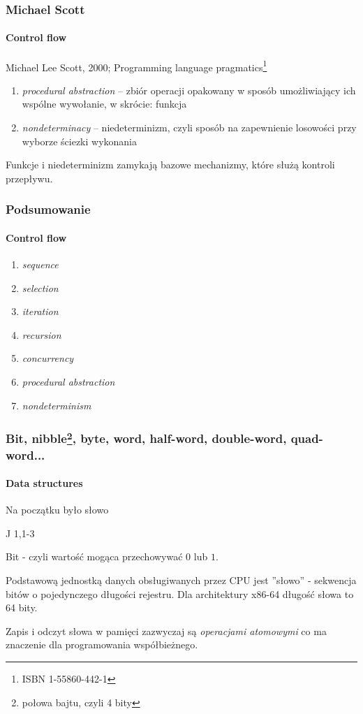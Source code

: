 \documentclass[aspectratio=169]{beamer}
\begin{document}
\begin{frame}
    \frametitle{Michael Scott}
    \framesubtitle{Control flow}

    Michael Lee Scott, 2000; Programming language pragmatics\footnote{ISBN
    1-55860-442-1}

    \vspace{1em}

    \begin{enumerate}
        \item \emph{procedural abstraction} -- zbiór operacji opakowany w sposób
            umożliwiający ich wspólne wywołanie, w skrócie: funkcja
        \item \emph{nondeterminacy} -- niedeterminizm, czyli sposób na
            zapewnienie losowości przy wyborze ściezki wykonania
    \end{enumerate}

    \vspace{1em}

    Funkcje i niedeterminizm zamykają bazowe mechanizmy, które służą kontroli
    przepływu.
\end{frame}

\begin{frame}
    \frametitle{Podsumowanie}
    \framesubtitle{Control flow}

    \begin{enumerate}
        \item \emph{sequence}
        \item \emph{selection}
        \item \emph{iteration}
        \item \emph{recursion}
        \item \emph{concurrency}
        \item \emph{procedural abstraction}
        \item \emph{nondeterminism}
    \end{enumerate}
\end{frame}

\begin{frame}
    \frametitle{Bit, nibble\footnote{połowa bajtu, czyli 4 bity}, byte, word,
        half-word, double-word, quad-word...}
    \framesubtitle{Data structures}

    \epigraph{Na początku było słowo}{J 1,1-3}

    Bit - czyli wartość mogąca przechowywać $0$ lub $1$.

    Podstawową jednostką danych obsługiwanych przez CPU jest ''słowo'' -
    sekwencja bitów o pojedynczego długości rejestru. Dla architektury x86-64
    długość słowa to 64 bity.

    Zapis i odczyt słowa w pamięci zazwyczaj są \emph{operacjami atomowymi} co
    ma znaczenie dla programowania współbieżnego.
\end{frame}
\end{document}
